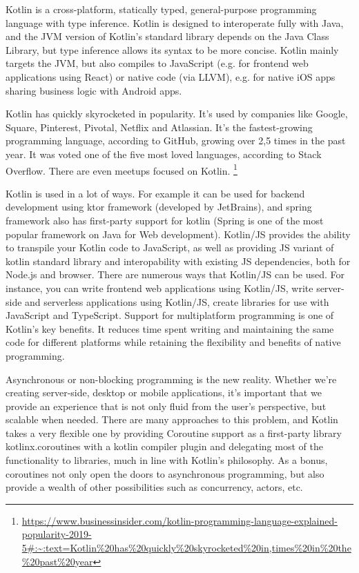 \par Kotlin is a cross-platform, statically typed, general-purpose programming language with type inference. Kotlin is designed to interoperate fully with Java, and the JVM version of Kotlin's standard library depends on the Java Class Library, but type inference allows its syntax to be more concise. Kotlin mainly targets the JVM, but also compiles to JavaScript (e.g. for frontend web applications using React) or native code (via LLVM), e.g. for native iOS apps sharing business logic with Android apps. %

\par Kotlin has quickly skyrocketed in popularity. It's used by companies like Google, Square, Pinterest, Pivotal, Netflix and Atlassian. It's the fastest-growing programming language, according to GitHub, growing over 2,5 times in the past year. It was voted one of the five most loved languages, according to Stack Overflow. There are even meetups focused on Kotlin. \footnote{\url{https://www.businessinsider.com/kotlin-programming-language-explained-popularity-2019-5\#:\~:text=Kotlin\%20has\%20quickly\%20skyrocketed\%20in,times\%20in\%20the\%20past\%20year}}
\par Kotlin is used in a lot of ways. For example it can be used for backend development using ktor framework (developed by JetBrains), and spring framework also has first-party support for kotlin (Spring is one of the most popular framework on Java for Web development). Kotlin/JS provides the ability to transpile your Kotlin code to JavaScript, as well as providing JS variant of kotlin standard library and interopability with existing JS dependencies, both for Node.js and browser. There are numerous ways that Kotlin/JS can be used. For instance, you can write frontend web applications using Kotlin/JS,
write server-side and serverless applications using Kotlin/JS, create libraries for use with JavaScript and TypeScript. Support for multiplatform programming is one of Kotlin’s key benefits. It reduces time spent writing and maintaining the same code for different platforms while retaining the flexibility and benefits of native programming. 

\par Asynchronous or non-blocking programming is the new reality. Whether we're creating server-side, desktop or mobile applications, it's important that we provide an experience that is not only fluid from the user's perspective, but scalable when needed.
There are many approaches to this problem, and Kotlin takes a very flexible one by providing Coroutine support as a first-party library kotlinx.coroutines with a kotlin compiler plugin and delegating most of the functionality to libraries, much in line with Kotlin's philosophy.
As a bonus, coroutines not only open the doors to asynchronous programming, but also provide a wealth of other possibilities such as concurrency, actors, etc.

